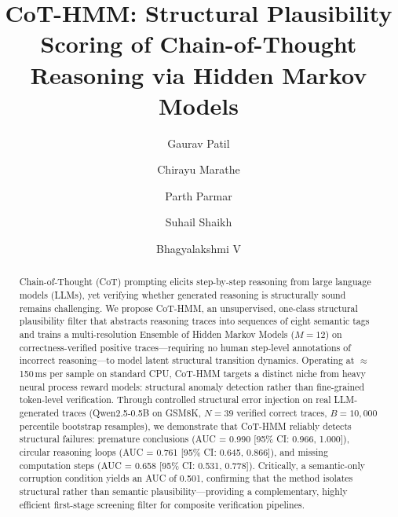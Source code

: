 \documentclass{llncs}
\begin{document}
\title{CoT-HMM: Structural Plausibility Scoring of Chain-of-Thought Reasoning via Hidden Markov Models}

\author{Gaurav Patil \and
Chirayu Marathe \and
Parth Parmar \and
Suhail Shaikh \and
Bhagyalakshmi V}



\maketitle

\begin{abstract}
Chain-of-Thought (CoT) prompting elicits step-by-step reasoning from large language models (LLMs), yet verifying whether generated reasoning is structurally sound remains challenging. We propose CoT-HMM, an unsupervised, one-class structural plausibility filter that abstracts reasoning traces into sequences of eight semantic tags and trains a multi-resolution Ensemble of Hidden Markov Models ($M=12$) on correctness-verified positive traces---requiring no human step-level annotations of incorrect reasoning---to model latent structural transition dynamics. Operating at $\approx$150\,ms per sample on standard CPU, CoT-HMM targets a distinct niche from heavy neural process reward models: structural anomaly detection rather than fine-grained token-level verification. Through controlled structural error injection on real LLM-generated traces (Qwen2.5-0.5B on GSM8K, $N=39$ verified correct traces, $B=10{,}000$ percentile bootstrap resamples), we demonstrate that CoT-HMM reliably detects structural failures: premature conclusions (AUC = 0.990 [95\% CI: 0.966, 1.000]), circular reasoning loops (AUC = 0.761 [95\% CI: 0.645, 0.866]), and missing computation steps (AUC = 0.658 [95\% CI: 0.531, 0.778]). Critically, a semantic-only corruption condition yields an AUC of 0.501, confirming that the method isolates structural rather than semantic plausibility---providing a complementary, highly efficient first-stage screening filter for composite verification pipelines.

\end{abstract}
\end{document}

